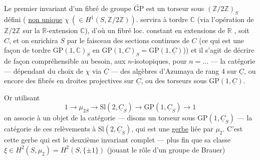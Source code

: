 Le premier invariant d'un fibré de groupe $\widetilde{\mathrm{GP}}$
est un  torseur  sous $(\mathbb Z/2\mathbb Z)_S$
 défini (
\uline{non unique}  $\chi\ (\in H^1(S,\mathbb Z/2\mathbb Z))$.
 servira à tordre $\mathbb C$
(via l'opération  de $\mathbb Z/2\mathbb Z$ sur
la $\mathbb R$-extension $\mathbb C$),  d'où un fibré loc.
constant en  extensions 
de $\mathbb R$ ,
soit $C$, et on  enrichira $S$
par le faisceau  des sections continues de
$C$ (ce qui est une façon de tordre
 $\mathrm{GP}(1,\mathbb C)_S$
en $\mathrm{GP}(1,C)_S=\mathrm{GP}(1,\underline C)$))
et il s'agit de  décrire de façon
compréhensible   au besoin,
aux \deleted{\unsure{$\infty$}}$n$-isotopiques, pour $n=\ldots$ --- la catégorie
--- dépendant du choix de $\chi$ via $\underline C$ --- des
algèbres d'Azumaya de rang $4$ sur $\underline C$,
ou encore des fibrés en droites projectives
sur $\underline C$, ou des torseurs sous $\mathrm{GP}(1,\underline C)$.

Or utilisant  
\[
1\longrightarrow\mu_{2S}\longrightarrow\mathrm{Sl}(2,\underline C_S)
\longrightarrow\mathrm{GP}(1,\underline C_S)\longrightarrow1
\]
on associe à un objet de la catégorie
--- disons un torseur sous $\mathrm{GP}(1,\underline C_S)$ --- la
catégorie  de ces relèvements à
$\mathrm{Sl}(2,\underline C_S)$,
qui est une \uline{gerbe}  liée par $\mu_2$.
C'est cette gerbe qui est le deuxième
invariant complet --- plus fin que
sa classe  
$\xi\in H^2(S,\mu_2)=H^2(S,\{\pm1\})$
(jouant le rôle
d'un groupe de Brauer)

